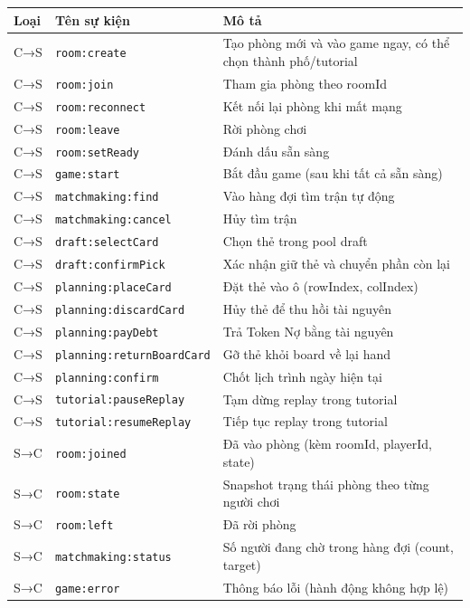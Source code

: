 \begin{longtable}{|l|l|p{10cm}|}
\hline
\rowcolor[rgb]{0.8, 0.9, 1.0}
\textbf{Loại} & \textbf{Tên sự kiện} & \textbf{Mô tả} \\
\hline
C→S & \texttt{room:create} & Tạo phòng mới và vào game ngay, có thể chọn thành phố/tutorial \\
C→S & \texttt{room:join} & Tham gia phòng theo roomId \\
C→S & \texttt{room:reconnect} & Kết nối lại phòng khi mất mạng \\
C→S & \texttt{room:leave} & Rời phòng chơi \\
C→S & \texttt{room:setReady} & Đánh dấu sẵn sàng \\
C→S & \texttt{game:start} & Bắt đầu game (sau khi tất cả sẵn sàng) \\
C→S & \texttt{matchmaking:find} & Vào hàng đợi tìm trận tự động \\
C→S & \texttt{matchmaking:cancel} & Hủy tìm trận \\
C→S & \texttt{draft:selectCard} & Chọn thẻ trong pool draft \\
C→S & \texttt{draft:confirmPick} & Xác nhận giữ thẻ và chuyển phần còn lại \\
C→S & \texttt{planning:placeCard} & Đặt thẻ vào ô (rowIndex, colIndex) \\
C→S & \texttt{planning:discardCard} & Hủy thẻ để thu hồi tài nguyên \\
C→S & \texttt{planning:payDebt} & Trả Token Nợ bằng tài nguyên \\
C→S & \texttt{planning:returnBoardCard} & Gỡ thẻ khỏi board về lại hand \\
C→S & \texttt{planning:confirm} & Chốt lịch trình ngày hiện tại \\
C→S & \texttt{tutorial:pauseReplay} & Tạm dừng replay trong tutorial \\
C→S & \texttt{tutorial:resumeReplay} & Tiếp tục replay trong tutorial \\
\hline
S→C & \texttt{room:joined} & Đã vào phòng (kèm roomId, playerId, state) \\
S→C & \texttt{room:state} & Snapshot trạng thái phòng theo từng người chơi \\
S→C & \texttt{room:left} & Đã rời phòng \\
S→C & \texttt{matchmaking:status} & Số người đang chờ trong hàng đợi (count, target) \\
S→C & \texttt{game:error} & Thông báo lỗi (hành động không hợp lệ) \\
\hline
\end{longtable}

